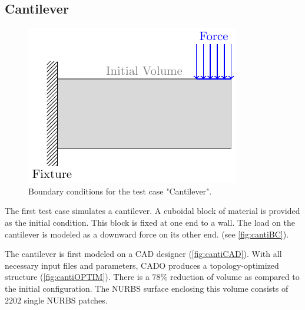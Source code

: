\subsection{Cantilever}
\label{ssec:canti}

\begin{figure}[H]
\begin{center}
\includegraphics[scale=0.8]{Pictures/tikzCantilever/canti.pdf}
\end{center}
\caption{Boundary conditions for the test case "Cantilever".}
\label{fig:cantiBC}
\end{figure}

The first test case simulates a cantilever. A cuboidal block of material is provided as the initial condition. This block is fixed at one end to a wall. The load on the cantilever is modeled as a downward force on its other end. (see \autoref{fig:cantiBC}).

The cantilever is first modeled on a CAD designer (\autoref{fig:cantiCAD}). With all necessary input files and parameters, CADO produces a topology-optimized structure (\autoref{fig:cantiOPTIM}). There is a $78\%$ reduction of volume as compared to the initial configuration. The NURBS surface enclosing this volume consists of $2202$ single NURBS patches.

